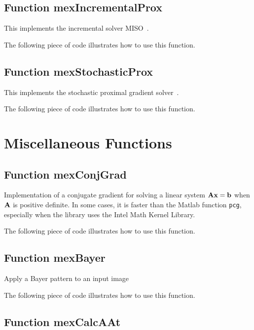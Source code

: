 \documentclass[a4paper, 11pt]{article}
\begin{document}
\subsection{Function mexIncrementalProx}
This implements the incremental solver MISO~\cite{mairal16}.

The following piece of code illustrates how to use this function.


\subsection{Function mexStochasticProx}
This implements the stochastic proximal gradient solver~\cite{mairal15}.

The following piece of code illustrates how to use this function.


\section{Miscellaneous Functions}

\subsection{Function mexConjGrad}

Implementation of a conjugate gradient for solving a linear system ${\mathbf A}{\mathbf x}={\mathbf b}$
when ${\mathbf A}$ is positive definite. In some cases, it is faster than the Matlab
function \verb|pcg|, especially when the library uses the Intel Math Kernel Library.
%    

The following piece of code illustrates how to use this function.


\subsection{Function mexBayer}

Apply a Bayer pattern to an input image
%    

The following piece of code illustrates how to use this function.



\subsection{Function mexCalcAAt}
\end{document}
